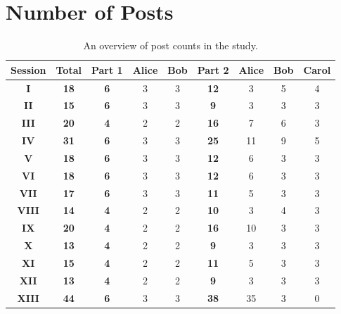 \section{Number of Posts}
\label{C}
\begin{table*}[h!]
  \caption{An overview of post counts in the study.}
  \begin{tabular}{c|c|c|cc|c|ccc}
    \toprule
    \textbf{Session} & \textbf{Total} & \textbf{Part 1} &\textbf{Alice} &\textbf{Bob} &\textbf{Part 2} &\textbf{Alice} &\textbf{Bob} &\textbf{Carol}\\
    \midrule
    \textbf{I} & \textbf{18} & \textbf{6} & 3 & 3 & \textbf{12} & 3 & 5 & 4\\
    \textbf{II} & \textbf{15} & \textbf{6} & 3 & 3 & \textbf{9} & 3 & 3 & 3\\
    \textbf{III} & \textbf{20} & \textbf{4} & 2 & 2 & \textbf{16} & 7 & 6 & 3\\
    \textbf{IV} & \textbf{31} & \textbf{6} & 3 & 3 & \textbf{25} & 11 & 9 & 5\\
    \textbf{V} & \textbf{18} & \textbf{6} & 3 & 3 & \textbf{12} & 6 & 3 & 3\\
    \textbf{VI} & \textbf{18} & \textbf{6} & 3 & 3 & \textbf{12} & 6 & 3 & 3\\
    \textbf{VII} & \textbf{17} & \textbf{6} & 3 & 3 & \textbf{11} & 5 & 3 & 3\\
    \textbf{VIII} & \textbf{14} & \textbf{4} & 2 & 2 & \textbf{10} & 3 & 4 & 3\\
    \textbf{IX} & \textbf{20} & \textbf{4} & 2 & 2 & \textbf{16} & 10 & 3 & 3\\
    \textbf{X} & \textbf{13} & \textbf{4} & 2 & 2 & \textbf{9} & 3 & 3 & 3\\
    \textbf{XI} & \textbf{15} & \textbf{4} & 2 & 2 & \textbf{11} & 5 & 3 & 3\\
    \textbf{XII} & \textbf{13} & \textbf{4} & 2 & 2 & \textbf{9} & 3 & 3 & 3\\
    \textbf{XIII} & \textbf{44} & \textbf{6} & 3 & 3 & \textbf{38} & 35 & 3 & 0\\
    \bottomrule
  \end{tabular}
\end{table*}